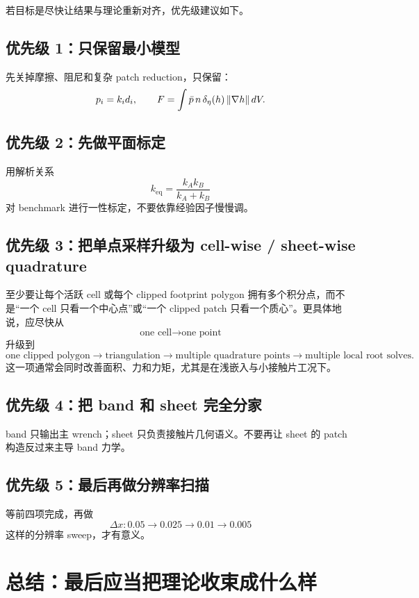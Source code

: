 \documentclass[12pt,a4paper]{ctexart}
\begin{document}
若目标是尽快让结果与理论重新对齐，优先级建议如下。

\subsection{优先级 1：只保留最小模型}
先关掉摩擦、阻尼和复杂 patch reduction，只保留：
\begin{equation}
    p_i=k_i d_i,
    \qquad
    F = \int \bar p\,n\,\delta_\eta(h)\,\norm{\nabla h}\,dV.
\end{equation}

\subsection{优先级 2：先做平面标定}
用解析关系
\begin{equation}
    k_{\mathrm{eq}}=\frac{k_Ak_B}{k_A+k_B}
\end{equation}
对 benchmark 进行一性标定，不要依靠经验因子慢慢调。

\subsection{优先级 3：把单点采样升级为 cell-wise / sheet-wise quadrature}
至少要让每个活跃 cell 或每个 clipped footprint polygon 拥有多个积分点，而不是“一个 cell 只看一个中心点”或“一个 clipped patch 只看一个质心”。更具体地说，应尽快从
\[
    \text{one cell} \to \text{one point}
\]
升级到
\[
    \text{one clipped polygon} \to \text{triangulation} \to \text{multiple quadrature points} \to \text{multiple local root solves}.
\]
这一项通常会同时改善面积、力和力矩，尤其是在浅嵌入与小接触片工况下。

\subsection{优先级 4：把 band 和 sheet 完全分家}
band 只输出主 wrench；sheet 只负责接触片几何语义。不要再让 sheet 的 patch 构造反过来主导 band 力学。

\subsection{优先级 5：最后再做分辨率扫描}
等前四项完成，再做
\begin{equation}
    \Delta x: 0.05 \to 0.025 \to 0.01 \to 0.005
\end{equation}
这样的分辨率 sweep，才有意义。

\section{总结：最后应当把理论收束成什么样}
\end{document}
